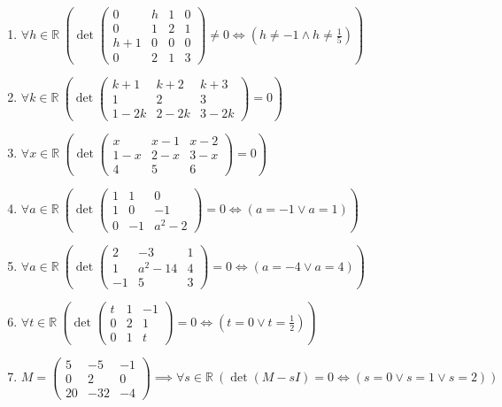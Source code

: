 \documentclass[11pt,a4paper]{article}
\begin{document}
\begin{enumerate}
\item $\displaystyle \forall h \in \mathbb{R}\ \left( \det \begin{pmatrix} 0 & h & 1 & 0 \\ 0 & 1 & 2 & 1 \\ h + 1 & 0 & 0 & 0 \\ 0 & 2 & 1 & 3 \end{pmatrix} \neq 0 \iff \left( h \neq -1 \land h \neq \frac{1}{5} \right) \right)$
\item $\displaystyle \forall k \in \mathbb{R}\ \left( \det \begin{pmatrix} k + 1 & k + 2 & k + 3 \\ 1 & 2 & 3 \\ 1 - 2k & 2 - 2k & 3 - 2k \end{pmatrix} = 0 \right)$
\item $\displaystyle \forall x \in \mathbb{R}\ \left( \det \begin{pmatrix} x & x - 1 & x - 2 \\ 1 - x & 2 - x & 3 - x \\ 4 & 5 & 6 \end{pmatrix} = 0 \right)$
\item $\displaystyle \forall a \in \mathbb{R}\ \left( \det \begin{pmatrix} 1 & 1 & 0 \\ 1 & 0 & -1 \\ 0 & -1 & a^{2} - 2 \end{pmatrix} = 0 \iff \left( a = -1 \lor a = 1 \right) \right)$
\item $\displaystyle \forall a \in \mathbb{R}\ \left( \det \begin{pmatrix} 2 & -3 & 1 \\ 1 & a^{2} - 14 & 4 \\ -1 & 5 & 3 \end{pmatrix} = 0 \iff \left( a = -4 \lor a = 4 \right) \right)$
\item $\displaystyle \forall t \in \mathbb{R}\ \left( \det \begin{pmatrix} t & 1 & -1 \\ 0 & 2 & 1 \\ 0 & 1 & t \end{pmatrix} = 0 \iff \left( t = 0 \lor t = \frac{1}{2} \right) \right)$
\item $\displaystyle M = \begin{pmatrix} 5 & -5 & -1 \\ 0 & 2 & 0 \\ 20 & -32 & -4 \end{pmatrix} \implies \forall s \in \mathbb{R}\ \left( \det\left( M - sI \right) = 0 \iff \left( s = 0 \lor s = 1 \lor s = 2 \right) \right)$

\end{enumerate}
\end{document}
